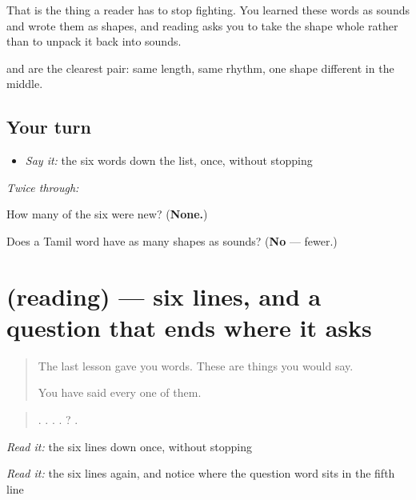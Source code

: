 That is the thing a reader has to stop fighting. You learned these words as sounds and wrote them as shapes, and reading asks you to take the shape whole rather than to unpack it back into sounds.

\textbf{} and \textbf{} are the clearest pair: same length, same rhythm, one shape different in the middle.

\subsection*{Your turn}
\begin{itemize}
\raggedright
  \item \emph{Say it:} the six words down the list, once, without stopping
\end{itemize}

\emph{Twice through:}

\begin{tcolorbox}[breakable,colback=teal!4,colframe=teal!35!black,title={Before you move on}]
How many of the six were new? (\textbf{None.})

Does a Tamil word have as many shapes as sounds? (\textbf{No} — fewer.)
\end{tcolorbox}
\section[(reading)]{(reading) — six lines, and a question that ends where it asks}

\label{lesson:TA-C84-lines}



\begin{quote}
The last lesson gave you words. These are things you would say.

You have said every one of them.
\end{quote}

\begin{tcolorbox}[breakable,skin=enhanced,colback=orange!6,colframe=orange!45!black,boxrule=0.5pt,arc=1mm,left=6pt,right=6pt,top=4pt,bottom=4pt,fonttitle=\bfseries,title={Read this}]
\begin{quote}
. . . .   ? .
\end{quote}

\emph{Read it:} the six lines down once, without stopping

\emph{Read it:} the six lines again, and notice where the question word sits in the fifth line
\end{tcolorbox}

